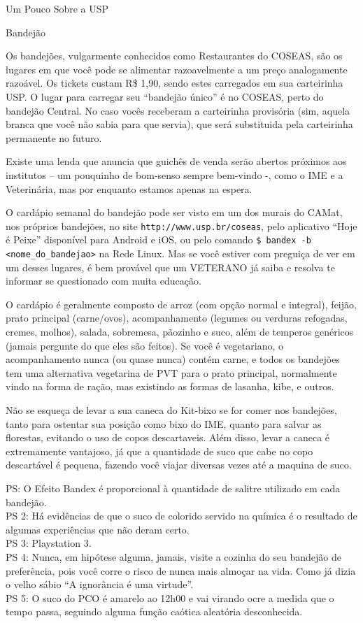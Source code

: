 \begin{secao}{Um Pouco Sobre a USP}
\begin{subsecao}{Bandejão}


Os bandejões, vulgarmente conhecidos como Restaurantes do COSEAS, são os lugares
em que você pode se alimentar razoavelmente a um preço analogamente razoável.
Os tickets custam R\$ 1,90, sendo estes carregados em sua carteirinha USP. O 
lugar para carregar seu ``bandejão único'' é no COSEAS, perto do bandejão 
Central. No caso vocês receberam a carteirinha provisória (sim, aquela 
branca que você não sabia para que servia), que será substituida pela carteirinha
permanente no futuro.

Existe uma lenda que anuncia que guichês de venda serão abertos próximos aos
institutos – um pouquinho de bom-senso sempre bem-vindo -, como o IME e
a Veterinária, mas por enquanto estamos apenas na espera.

O cardápio semanal do bandejão pode ser visto em um dos murais do CAMat, nos
próprios bandejões, no site {\tt http://www.usp.br/coseas}, pelo aplicativo 
``Hoje é Peixe'' disponível para Android e iOS, ou pelo comando 
{\tt \$ bandex -b <nome\_do\_bandejao>} na Rede Linux. Mas se você estiver
com preguiça de ver em um desses lugares, é bem provável que um VETERANO já saiba
e resolva te informar se questionado com muita educação.

O cardápio é geralmente composto de arroz (com opção normal e integral), feijão,
prato principal (carne/ovos), acompanhamento (legumes ou verduras refogadas, 
cremes, molhos), salada, sobremesa, pãozinho e suco, além de temperos genéricos
(jamais pergunte do que eles são feitos). Se você é vegetariano, o 
acompanhamento nunca (ou quase nunca) contém carne, e todos os bandejões tem uma
alternativa vegetarina de PVT para o prato principal, normalmente vindo na forma
de ração, mas existindo as formas de lasanha, kibe, e outros.


Não se esqueça de levar a sua caneca do Kit-bixo se for comer nos bandejões,
tanto para ostentar sua posição como bixo do IME, quanto para salvar as florestas, 
evitando o uso de copos descartaveis. Além disso, levar a caneca é extremamente
vantajoso, já que a quantidade de suco que cabe no copo descartável é pequena,
fazendo você viajar diversas vezes até a maquina de suco.


PS: O Efeito Bandex é proporcional à quantidade de salitre utilizado em cada bandejão.\\
PS 2: Há evidências de que o suco de colorido servido na química é o resultado de algumas
experiências que não deram certo.\\
PS 3: Playstation 3.\\
PS 4: Nunca, em hipótese alguma, jamais, visite a cozinha do seu bandejão de preferência,
pois você corre o risco de nunca mais almoçar na vida. Como já dizia o velho sábio ``A
ignorância é uma virtude''.\\
PS 5: O suco do PCO é amarelo ao 12h00 e vai virando ocre a medida que o tempo passa,
seguindo alguma função caótica aleatória desconhecida.


\end{subsecao}
\end{secao}
